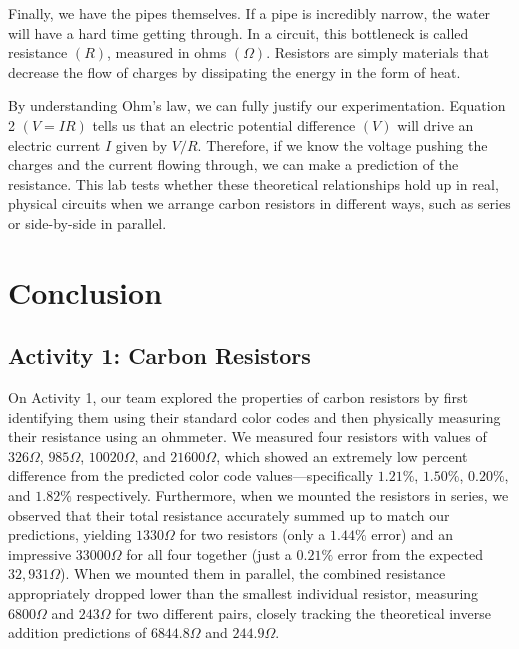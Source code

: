 \documentclass[12pt]{article}
\begin{document}
Finally, we have the pipes themselves. If a pipe is incredibly narrow, the water
will have a hard time getting through. In a circuit, this bottleneck is called
resistance $(R)$, measured in ohms $(\Omega)$. Resistors are simply materials that
decrease the flow of charges by dissipating the energy in the form of heat.

By understanding Ohm's law, we can fully justify our experimentation. Equation 2
$(V=IR)$ tells us that an electric potential difference $(V)$ will drive an
electric current $I$ given by $V/R$. Therefore, if we know the voltage pushing
the charges and the current flowing through, we can make a prediction of the
resistance. This lab tests whether these theoretical relationships hold up in
real, physical circuits when we arrange carbon resistors in different ways, such
as series or side-by-side in parallel.

\section{Conclusion}
\subsection*{Activity 1: Carbon Resistors}
On Activity 1, our team explored the properties of carbon resistors by first
identifying them using their standard color codes and then physically measuring
their resistance using an ohmmeter. We measured four resistors with values of
$326 \Omega$, $985 \Omega$, $10 020 \Omega$, and $21 600 \Omega$, which showed
an extremely low percent difference from the predicted color code
values—specifically $1.21 \%$, $1.50 \%$, $0.20 \%$, and $1.82 \%$ respectively.
Furthermore, when we mounted the resistors in series, we observed that their
total resistance accurately summed up to match our predictions,
yielding $1 330 \Omega$ for two resistors (only a $1.44 \%$ error) and an
impressive $33 000 \Omega$ for all four together (just a $0.21 \%$ error from
the expected  $32,931 \Omega$). When we mounted them in parallel, the combined
resistance appropriately dropped lower than the smallest individual resistor,
measuring $6 800 \Omega$ and $243 \Omega$ for two different pairs, closely
tracking the theoretical inverse addition predictions of $6 844.8 \Omega$
and $244.9 \Omega$.
\end{document}

